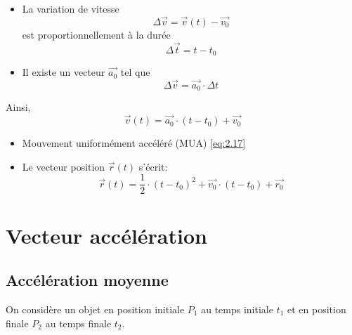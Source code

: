 \documentclass[
    11pt,
    a4paper,
    oneside,
    headinlcude, footinclude,
    twoside,
]{report}
\renewcommand{\vec}[1]{\overrightarrow{#1}}
\begin{document}
\begin{enumerate}
\begin{center}
\begin{minipage}{.5\linewidth}
{
}
\end{minipage}
\begin{minipage}{.49\linewidth}
\begin{itemize}
\item La variation de vitesse $$\Delta \vec v = \vec v (t) - \vec{v_{0}} $$
est proportionnellement à la durée $$\Delta \vec t = t
- t_{0}$$
\item Il existe un vecteur $\vec{a_{0}}$ tel que $$\Delta
\vec v = \vec{a_{0}} \cdot \Delta t$$
\end{itemize}
\end{minipage}
\end{center}
\end{enumerate}

Ainsi, 
\begin{equation}
\label{eq:2.17}
\vec v (t) = \vec{a_{0}} \cdot (t - t_{0}) + \vec{v_{0}} 
\end{equation}

\begin{itemize}
\item Mouvement uniformément accéléré (MUA) \eqref{eq:2.17}
\item Le vecteur position $\vec r (t)$ s'écrit:
\begin{equation}
\vec r (t) = \frac{1}{2} \cdot (t - t_{0})^{2} + \vec{v_{0}} \cdot
(t - t_{0}) + \vec{r_{0}} 
\end{equation}
\end{itemize}

\section{Vecteur accélération}
\label{sec:vecteur_acceleration}

\subsection{Accélération moyenne}
\label{sub:acceleration_moyenne}

On considère un objet en position initiale $P_{1}$ au temps initiale $t_{1}$ et
en position finale $P_{2}$ au temps finale $t_{2}$.
\end{document}
